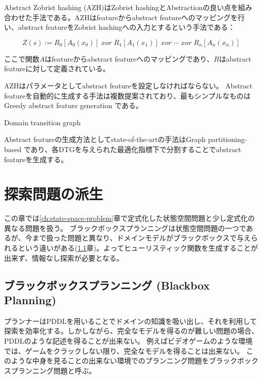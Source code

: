 \documentclass[b5paper]{report}
\begin{document}
Abstract Zobrist hashing (AZH)はZobrist hashingとAbstractionの良い点を組み合わせた手法である\cite{jinnai2016structured}。AZHはfeatureからabstract featureへのマッピングを行い、abstract featureをZobrist hashingへの入力とするという手法である：

\begin{equation}
\label{eq:abstract-zobrist}
 	Z(s) := R_{0}[A_0(x_{0})]\; xor\; R_{1}[A_1(x_{1})]\; xor\; \cdots\; xor\; R_{n}[A_n(x_{n})]%
\end{equation}

ここで関数$A$はfeatureからabstract featureへのマッピングであり、$R$はabstract featureに対して定義されている。

AZHはパラメータとしてabstract featureを設定しなければならない。
Abstract featureを自動的に生成する手法は複数提案されており、最もシンプルなものはGreedy abstract feature generation \cite{jinnai2016automated}である。

Domain transition graph

Abstract featureの生成方法としてstate-of-the-artの手法はGraph partitioning-based \cite{jinnai2017work}であり、各DTGを与えられた最適化指標下で分割することでabstract featureを生成する。



\chapter{探索問題の派生}
\label{ch:search-problem-variants}

この章では\ref{ch:state-space-problem}章で定式化した状態空間問題と少し定式化の異なる問題を扱う。
ブラックボックスプランニングは状態空間問題の一つであるが、今まで扱った問題と異なり、ドメインモデルがブラックボックスで与えられるという違いがある(\ref{sec:black-box-planning}章)。よってヒューリスティック関数を生成することが出来ず、情報なし探索が必要となる。




\section{ブラックボックスプランニング (Blackbox Planning)}
\label{sec:black-box-planning}

プランナーはPDDLを用いることでドメインの知識を吸い出し、それを利用して探索を効率化する。しかしながら、完全なモデルを得るのが難しい問題の場合、PDDLのような記述を得ることが出来ない。
例えばビデオゲームのような環境では、ゲームをクラックしない限り、完全なモデルを得ることは出来ない。
このような中身を見ることの出来ない環境でのプランニング問題をブラックボックスプランニング問題と呼ぶ。
\end{document}
